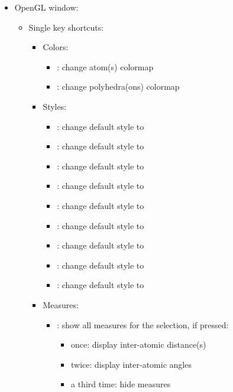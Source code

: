 {\begin{itemize}
\begin{itemize}
\item[] \Ctrl +  : Open the data plot editing tool box [Fig.~\ref{edittool}]
\item[] \Ctrl +  : Export image
\item[] \Ctrl +  : Save / export data
\end{itemize}
\item OpenGL window:
\begin{itemize}
\item Single key shortcuts:
\begin{itemize}
\item Colors: 
\begin{itemize}
\item[]  : change atom(s) colormap
\item[]  : change polyhedra(ons) colormap
\end{itemize}
\item Styles:
\begin{itemize}
\item[]  : change default style to 
\item[]  : change default style to 
\item[]  : change default style to 
\item[]  : change default style to 
\item[]  : change default style to 
\item[]  : change default style to 
\item[]  : change default style to 
\item[]  : change default style to 
\item[]  : change default style to 
\end{itemize}
\item Measures:
\begin{itemize}
\item[]  : show all measures for the selection, if pressed: 
\begin{itemize}
\item once: display inter-atomic distance(s)
\item twice: display inter-atomic angles
\item a third time: hide measures
\end{itemize}

\end{itemize}
\end{itemize}
\end{itemize}
\end{itemize}}
